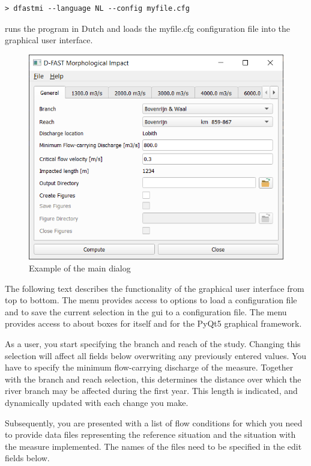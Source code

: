 \begin{Verbatim}
> dfastmi --language NL --config myfile.cfg
\end{Verbatim}

runs the program in Dutch and loads the myfile.cfg configuration file into the graphical user interface.

\begin{figure}
\center
\includegraphics[width=12cm]{figures/main_dialog.png}
\caption{Example of the main dialog}
\end{figure}

The following text describes the functionality of the graphical user interface from top to bottom.
The  menu provides access to options to load a configuration file and to save the current selection in the gui to a configuration file.
The  menu provides access to about boxes for \dfastmi itself and for the PyQt5 graphical framework.

As a user, you start specifying the branch and reach of the study.
Changing this selection will affect all fields below overwriting any previously entered values.
You have to specify the minimum flow-carrying discharge of the measure.
Together with the branch and reach selection, this determines the distance over which the river branch may be affected during the first year.
This length  is indicated, and dynamically updated with each change you make.

Subsequently, you are presented with a list of flow conditions for which you need to provide data files representing the reference situation and the situation with the measure implemented.
The names of the files need to be specified in the edit fields below.

